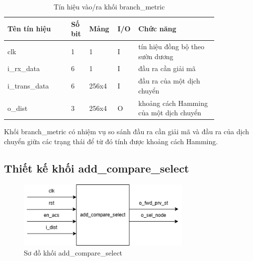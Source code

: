 \documentclass[../DoAn.tex]{subfiles}
\begin{document}
\begin{table}[H]
\centering{}
    \caption{Tín hiệu vào/ra khối branch\_metric}
    \begin{tabular}{|p{0.28\linewidth}|p{0.08\linewidth}|p{0.08\linewidth}|p{0.05\linewidth}|p{0.35\linewidth}|}
        \hline
        \textbf{Tên tín hiệu} & \textbf{Số bit}  & \textbf{Mảng}     & \textbf{I/O}   & \textbf{Chức năng} \\ \hline\hline
        clk  & 1   & 1     & I     & tín hiệu đồng bộ theo sườn dương \\ \hline
        i\_rx\_data  & 6   & 1     & I     & đầu ra cần giải mã \\ \hline
        i\_trans\_data  & 6   & 256x4     & I     &  đầu ra của một dịch chuyển  \\ \hline
        o\_dist  & 3   & 256x4     & O     & khoảng cách Hamming của một dịch chuyển  \\ \hline
        \end{tabular}
\end{table}

Khối branch\_metric có nhiệm vụ so sánh đầu ra cần giải mã và đầu ra của dịch chuyển giữa các trạng thái để từ đó tính được khoảng cách Hamming.

\subsection{Thiết kế khối add\_compare\_select}

\begin{figure}[H]
    \centering
    \includegraphics[width=0.75\textwidth, height=0.12\textheight, keepaspectratio]{Hinhve/Chuong 4/add compare select.png}
    \caption{Sơ đồ khối add\_compare\_select}
\end{figure}
\end{document}
